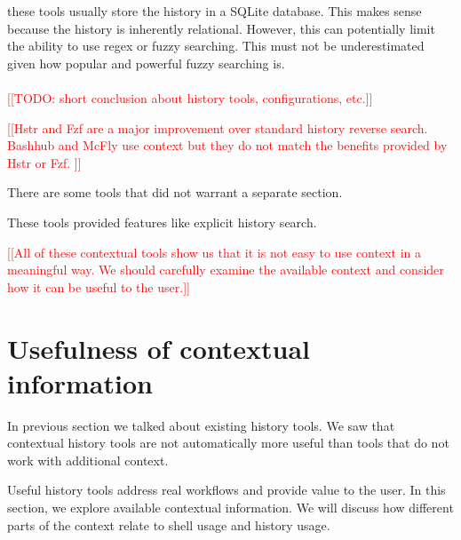 \documentclass[thesis=M,english]{FITthesis}[2012/10/20]
\newcommand{\redtext}[1]{\textcolor{red}{[[#1]]}}
\begin{document}
these tools usually store the history in a SQLite database. This makes sense because the history is inherently relational. However, this can potentially limit the ability to use regex or fuzzy searching. This must not be underestimated given how popular and powerful fuzzy searching is. 


\paragraph{}

\redtext{TODO: short conclusion about history tools, configurations, etc.}




\redtext{Hstr and Fzf are a major improvement over standard history reverse search. Bashhub and McFly use context but they do not match the benefits provided by Hstr or Fzf. }

There are some tools that did not warrant a separate section. 

These tools provided features like explicit history search.

\redtext{All of these contextual tools show us that it is not easy to use context in a meaningful way. We should carefully examine the available context and consider how it can be useful to the user.}

\section{Usefulness of contextual information}


In previous section we talked about existing history tools. We saw that contextual history tools are not automatically more useful than tools that do not work with additional context. 

Useful history tools address real workflows and provide value to the user.
In this section, we explore available contextual information. We will discuss how different parts of the context relate to shell usage and history usage. %
\end{document}
